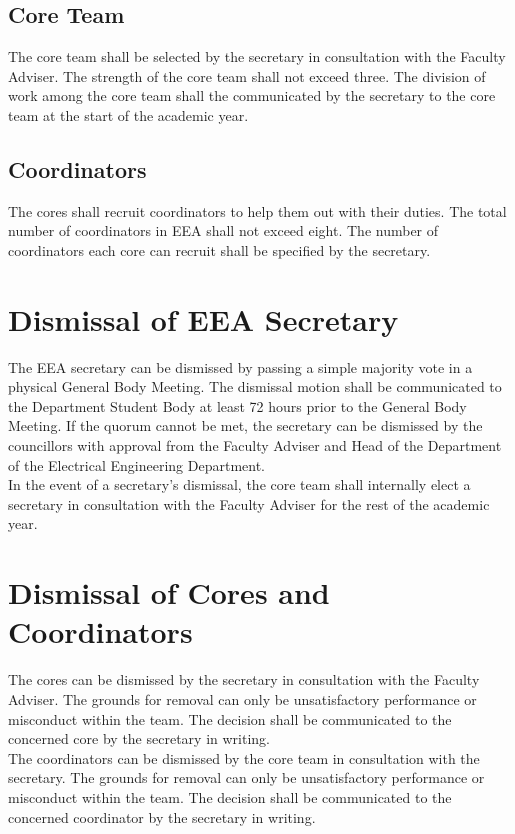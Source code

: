 \documentclass[12pt]{charter}
\begin{document}
\subsection{Core Team}
The core team shall be selected by the secretary in consultation with the Faculty Adviser. The strength of the core team shall not exceed three. The division of work among the core team shall the communicated by the secretary to the core team at the start of the academic year.

\subsection{Coordinators}
The cores shall recruit coordinators to help them out with their duties. The total number of coordinators in EEA shall not exceed eight. The number of coordinators each core can recruit shall be specified by the secretary.

\section{Dismissal of EEA Secretary}
The EEA secretary can be dismissed by passing a simple majority vote in a physical General Body Meeting. The dismissal motion shall be communicated to the Department Student Body at least 72 hours prior to the General Body Meeting. If the quorum cannot be met, the secretary can be dismissed by the councillors with approval from the Faculty Adviser and Head of the Department of the Electrical Engineering Department.\\
In the event of a secretary's dismissal, the core team shall internally elect a secretary in consultation with the Faculty Adviser for the rest of the academic year.

\section{Dismissal of Cores and Coordinators}
The cores can be dismissed by the secretary in consultation with the Faculty Adviser. The grounds for removal can only be unsatisfactory performance or misconduct within the team. The decision shall be communicated to the concerned core by the secretary in writing.\\
The coordinators can be dismissed by the core team in consultation with the secretary. The grounds for removal can only be unsatisfactory performance or misconduct within the team. The decision shall be communicated to the concerned coordinator by the secretary in writing.
\end{document}
